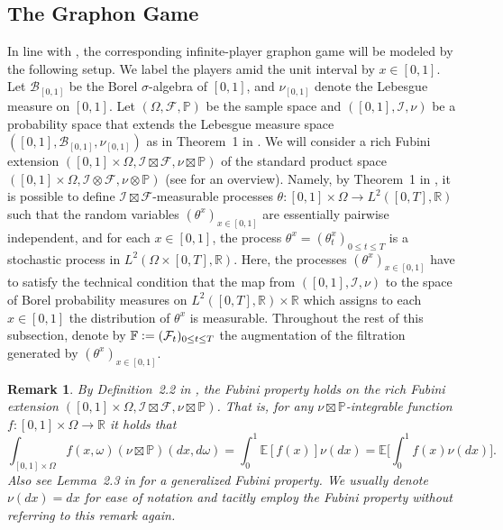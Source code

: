 \documentclass[11pt]{article}
\def\P{\mathbb{P}}
\def\E{{\mathbb{E}}}
\newcommand{\R}{{\mathbb R}}
\newcommand{\F}{{\mathbb F}}
\newcommand{\be}{\begin{equation}}
\newcommand{\ee}{\end{equation}}
\newtheorem{remark}[theorem]{Remark}
\numberwithin{equation}{section}
\begin{document}
\subsection{The Graphon Game}\label{subsec:definition-infinite-player-game}
In line with \cite{aurell2022stochastic,neuman2024stochastic,tangpi2024optimal}, the corresponding infinite-player graphon game will be modeled by the following setup. We label the players amid the unit interval by $x\in [0,1]$. 
Let $\mathcal{B}_{[0,1]}$ be the Borel $\sigma$-algebra of $[0,1]$, and $\nu_{[0,1]}$ denote the Lebesgue measure on $[0,1]$. Let $(\Omega,\mathcal{F},\P)$ be the sample space and $([0,1],\mathcal{I},\nu)$ be a probability space that extends the Lebesgue measure space $([0,1],\mathcal{B}_{[0,1]},\nu_{[0,1]})$ as in Theorem~1 in \cite{sun2009individual}. 
We will consider a rich Fubini extension $([0,1]\times\Omega,\mathcal{I}\boxtimes \mathcal{F},\nu\boxtimes\P)$ of the standard product space $([0,1]\times\Omega,\mathcal{I}\otimes \mathcal{F},\nu\otimes\P)$ (see \cite{sun2006exact,sun2009individual} for an overview). Namely, by Theorem~1 in \cite{sun2009individual}, it is possible to define $\mathcal{I  }\boxtimes \mathcal{F}$-measurable processes $\theta: [0,1]\times\Omega \to L^2([0,T],\R)$ such that the random variables $(\theta^x)_{x\in [0,1]}$ are essentially pairwise independent, and for each $x\in [0,1]$, the process $\theta^x=(\theta_t^x)_{0\leq t\leq T}$ is a stochastic process in $L^2(\Omega\times [0,T],\R)$. Here, the processes $(\theta^x)_{x\in [0,1]}$ have to satisfy the technical condition that the map from $([0,1],\mathcal{I},\nu)$ to the space of Borel probability measures on $L^2([0,T],\R)\times\R$ which assigns to each $x\in [0,1]$ the distribution of $\theta^x$ is measurable. Throughout the rest of this subsection, denote by $\F\vcentcolon=(\mathcal{F}_t)_{0\leq t\leq T}$ the augmentation of the filtration generated by $(\theta^x)_{x\in [0,1]}$.
\begin{remark}
By Definition~2.2 in \cite{sun2006exact}, the Fubini property holds on the rich Fubini extension $([0,1]\times\Omega,\mathcal{I}\boxtimes \mathcal{F},\nu\boxtimes\P)$. That is, for any $\nu\boxtimes\P$-integrable function $f:[0,1]\times\Omega\to\R$ it holds that
\be
\int_{[0,1]\times\Omega}f(x,\omega)(\nu\boxtimes\P)(dx,d\omega)=\int_0^1\E[f(x)]\nu(dx)=\E\Big[\int_0^1f(x)\nu(dx)\Big].
\ee
Also see Lemma~2.3 in \cite{sun2006exact} for a generalized Fubini property. 
We usually denote $\nu(dx)=dx$ for ease of notation and tacitly employ the Fubini property without referring to this remark again.
\end{remark}
\end{document}
